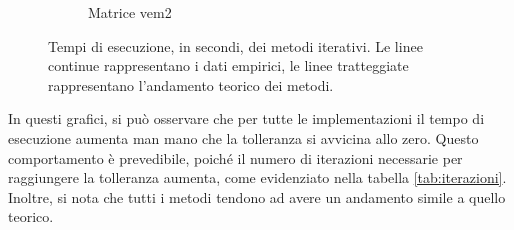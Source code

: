 \begin{figure}[!ht]
\begin{subfigure}{0.45\textwidth}
        \caption{Matrice vem2}
        \label{fig:time_vem2}
    \end{subfigure}
    \caption{Tempi di esecuzione, in secondi, dei metodi iterativi. Le linee
        continue rappresentano i dati empirici, le linee tratteggiate rappresentano
        l'andamento teorico dei metodi.}
    \label{fig:time}
\end{figure}

In questi grafici, si può osservare che per tutte le implementazioni il tempo di
esecuzione aumenta man mano che la tolleranza si avvicina allo zero. Questo
comportamento è prevedibile, poiché il numero di iterazioni necessarie per
raggiungere la tolleranza aumenta, come evidenziato nella tabella \ref{tab:iterazioni}.
Inoltre, si nota che tutti i metodi tendono ad avere un andamento simile a quello
teorico.
\begin{table}[!ht]
    \centering
    \begin{subtable}[!ht]{1\textwidth}
        \centering
\end{subtable}
\end{table}
